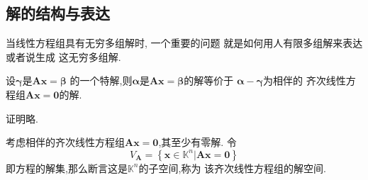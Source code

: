 \subsection{解的结构与表达}
当线性方程组具有无穷多组解时,
一个重要的问题
就是如何用人有限多组解来表达或者说生成
这无穷多组解.
\begin{green}
\begin{lemma}[相伴方程组的解]\label{lem:相伴方程组的解}
    设$\bm{\gamma}$是$\bm{Ax}=\bm{\beta}$
    的一个特解,则$\bm{\alpha}$是$
    \bm{Ax}=\bm{\beta}$的解等价于
    $\bm{\alpha}-\bm{\gamma}$为相伴的
    齐次线性方程组$\bm{Ax}=\bm{0}$的解.
\end{lemma}
\begin{Proof}
证明略.
\end{Proof}
\end{green}
\begin{green}
\begin{lemma}[解空间]\label{lem:解空间}
    考虑相伴的齐次线性方程组$\bm{Ax}=\bm{0}$,其至少有零解.
    令
    \[
    V_{\bm{A}}=\left\{\bm{x}\in \mathbb{K}^n\big|\bm{Ax}=\bm{0}\right\}
    \]
    即方程的解集,那么断言这是$\mathbb{K}^n$的子空间,称为
    该齐次线性方程组的解空间.
\end{lemma}
\end{green}
